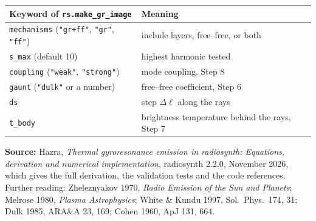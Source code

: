 \documentclass[11pt,a4paper]{article}
\newcommand{\code}[1]{\texttt{#1}}
\begin{document}
\begin{center}
\small
\begin{tabular}{@{}l l@{}}
\toprule
Keyword of \code{rs.make\_gr\_image} & Meaning \\
\midrule
\code{mechanisms} (\code{"gr+ff"}, \code{"gr"}, \code{"ff"}) & include layers, free--free, or both \\
\code{s\_max} (default 10) & highest harmonic tested \\
\code{coupling} (\code{"weak"}, \code{"strong"}) & mode coupling, Step 8 \\
\code{gaunt} (\code{"dulk"} or a number) & free--free coefficient, Step 6 \\
\code{ds} & step $\Delta\ell$ along the rays \\
\code{t\_body} & brightness temperature behind the rays, Step 7 \\
\bottomrule
\end{tabular}
\end{center}

\vspace{4pt}
{\small\color{head}\textbf{Source:} \color{gray} Hazra, \emph{Thermal gyroresonance emission in radiosynth:
Equations, derivation and numerical implementation}, radiosynth 2.2.0, November 2026, which gives
the full derivation, the validation tests and the code references. Further reading: Zheleznyakov
1970, \emph{Radio Emission of the Sun and Planets}; Melrose 1980, \emph{Plasma Astrophysics}; White \&
Kundu 1997, Sol.\ Phys.\ 174, 31; Dulk 1985, ARA\&A 23, 169; Cohen 1960, ApJ 131, 664.}
\end{document}
